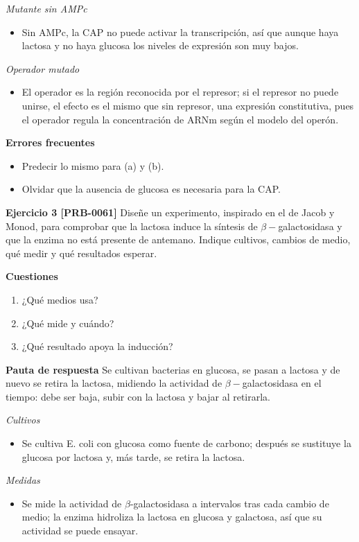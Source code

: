 \documentclass{book}
\begin{document}
\noindent\textit{Mutante sin AMPc}
\begin{itemize}
\item Sin AMPc, la CAP no puede activar la transcripción, así que aunque haya lactosa y no haya glucosa los niveles de expresión son muy bajos.
\end{itemize}

\noindent\textit{Operador mutado}
\begin{itemize}
\item El operador es la región reconocida por el represor; si el represor no puede unirse, el efecto es el mismo que sin represor, una expresión constitutiva, pues el operador regula la concentración de ARNm según el modelo del operón.
\end{itemize}

\noindent\textbf{Errores frecuentes}
\begin{itemize}
\item Predecir lo mismo para (a) y (b).
\item Olvidar que la ausencia de glucosa es necesaria para la CAP.
\end{itemize}

\noindent\textbf{Ejercicio 3 [PRB-0061]}
Diseñe un experimento, inspirado en el de Jacob y Monod, para comprobar que la lactosa induce la síntesis de \(\beta-\)galactosidasa y que la enzima no está presente de antemano. Indique cultivos, cambios de medio, qué medir y qué resultados esperar.


\noindent\textbf{Cuestiones}
\begin{enumerate}
\item ¿Qué medios usa?
\item ¿Qué mide y cuándo?
\item ¿Qué resultado apoya la inducción?
\end{enumerate}

\noindent\textbf{Pauta de respuesta}
Se cultivan bacterias en glucosa, se pasan a lactosa y de nuevo se retira la lactosa, midiendo la actividad de \(\beta-\)galactosidasa en el tiempo: debe ser baja, subir con la lactosa y bajar al retirarla.


\noindent\textit{Cultivos}
\begin{itemize}
\item Se cultiva E. coli con glucosa como fuente de carbono; después se sustituye la glucosa por lactosa y, más tarde, se retira la lactosa.
\end{itemize}

\noindent\textit{Medidas}
\begin{itemize}
\item Se mide la actividad de \(\beta\)-galactosidasa a intervalos tras cada cambio de medio; la enzima hidroliza la lactosa en glucosa y galactosa, así que su actividad se puede ensayar.
\end{itemize}
\end{document}
